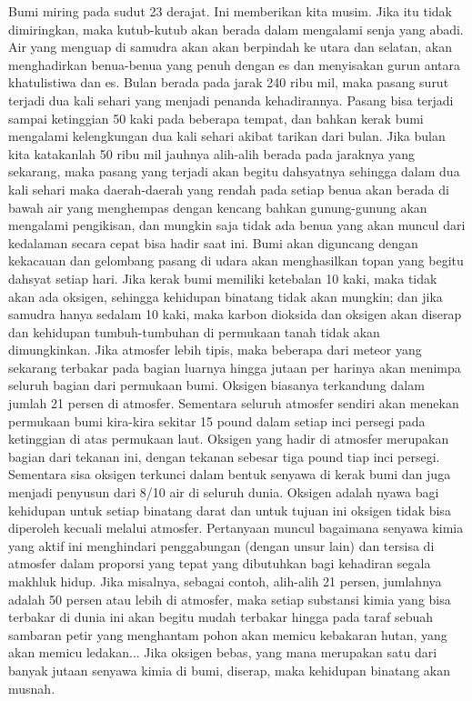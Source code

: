 \documentclass[]{article}
\begin{document}
Bumi miring pada sudut 23 derajat. Ini memberikan kita musim. Jika itu tidak dimiringkan, maka kutub-kutub akan berada dalam mengalami senja yang abadi. Air yang menguap di samudra akan akan berpindah ke utara dan selatan, akan menghadirkan benua-benua yang penuh dengan es dan menyisakan gurun antara khatulistiwa dan es. 
Bulan berada pada jarak  240 ribu mil, maka pasang surut terjadi dua kali sehari yang menjadi penanda kehadirannya. Pasang bisa terjadi sampai ketinggian 50 kaki pada beberapa tempat, dan bahkan kerak bumi mengalami kelengkungan dua kali sehari akibat tarikan dari bulan. Jika bulan kita katakanlah 50 ribu mil jauhnya alih-alih berada pada jaraknya yang sekarang, maka pasang yang terjadi akan begitu dahsyatnya sehingga dalam dua kali sehari maka daerah-daerah yang rendah pada setiap benua akan berada di bawah air yang  menghempas dengan kencang bahkan gunung-gunung akan mengalami pengikisan,  dan mungkin saja tidak ada benua yang akan muncul dari kedalaman secara cepat bisa hadir saat ini. Bumi akan diguncang dengan kekacauan dan gelombang pasang di udara akan menghasilkan topan yang begitu dahsyat setiap hari. 
Jika kerak bumi memiliki ketebalan 10 kaki, maka tidak akan ada oksigen, sehingga kehidupan binatang tidak akan mungkin; dan jika samudra hanya sedalam 10 kaki, maka karbon dioksida dan oksigen akan diserap dan kehidupan tumbuh-tumbuhan di permukaan tanah tidak akan dimungkinkan. Jika atmosfer lebih tipis, maka beberapa dari meteor yang sekarang terbakar pada bagian luarnya hingga jutaan per harinya akan menimpa seluruh bagian dari permukaan bumi. 
Oksigen biasanya terkandung dalam jumlah 21 persen di atmosfer. Sementara seluruh atmosfer sendiri akan menekan permukaan bumi kira-kira sekitar 15 pound  dalam setiap inci persegi pada ketinggian di atas permukaan laut. Oksigen yang hadir di atmosfer merupakan bagian dari tekanan ini, dengan tekanan sebesar tiga pound tiap inci persegi. Sementara sisa oksigen terkunci dalam bentuk senyawa di kerak bumi dan juga menjadi penyusun dari 8/10 air di seluruh dunia. Oksigen adalah nyawa bagi kehidupan untuk setiap binatang darat dan untuk tujuan ini oksigen tidak bisa diperoleh kecuali melalui atmosfer. 
Pertanyaan muncul bagaimana senyawa kimia yang aktif ini menghindari penggabungan (dengan unsur lain) dan tersisa di atmosfer dalam proporsi yang tepat yang dibutuhkan bagi kehadiran segala makhluk hidup. Jika misalnya, sebagai contoh, alih-alih 21 persen, jumlahnya adalah 50 persen atau lebih di atmosfer, maka setiap substansi kimia yang bisa terbakar di dunia ini akan begitu mudah terbakar hingga pada taraf sebuah sambaran petir yang menghantam pohon akan memicu kebakaran hutan, yang akan memicu ledakan... Jika oksigen bebas, yang mana merupakan satu dari banyak jutaan senyawa kimia di bumi, diserap, maka kehidupan binatang akan musnah. 
\end{document}

